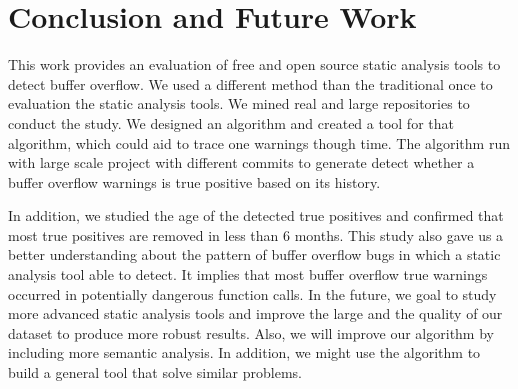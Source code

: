 \section{Conclusion and Future Work}

 This work provides an evaluation of free and open source static analysis tools to detect buffer overflow. We used a different method than the traditional once to evaluation the static analysis tools. We mined real and large repositories to conduct the study. We designed an algorithm and created a tool for that algorithm, which could aid to trace one warnings though time. The algorithm run with large scale project with different commits to generate detect whether a buffer overflow warnings is true positive based on its history. 
 
In addition, we studied the age of the detected true positives and confirmed that most true positives are removed in less than 6 months. This study also gave us a better understanding about the pattern of buffer overflow bugs in which a static analysis tool able to detect. It implies that most buffer overflow true warnings occurred in potentially dangerous function calls.  In the future, we goal to study more advanced static analysis tools and improve the large and the quality of our dataset to produce more robust results. Also, we will improve our algorithm by including more semantic analysis. In addition, we might use the algorithm to  build a general tool that solve similar problems.   

